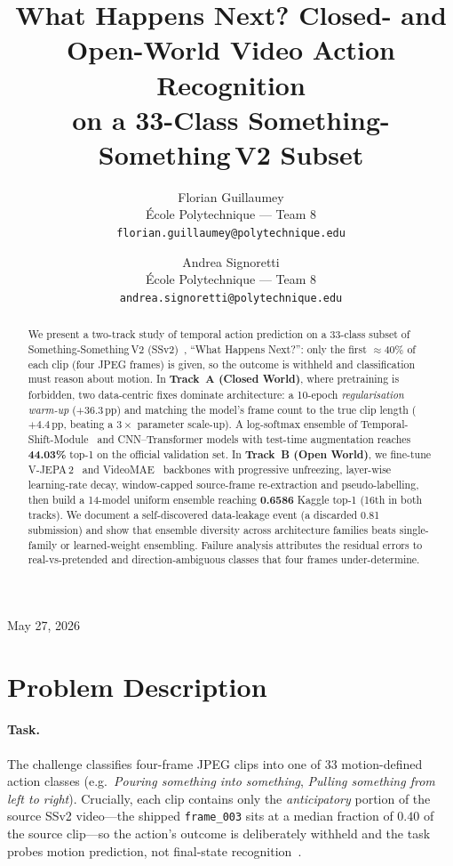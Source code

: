 \documentclass[10pt,twocolumn,letterpaper]{article}
\title{What Happens Next? Closed- and Open-World Video Action Recognition\\
on a 33-Class Something-Something\,V2 Subset}
\author{%
Florian Guillaumey\\
École Polytechnique --- Team 8\\
{\tt\small florian.guillaumey@polytechnique.edu}
\and
Andrea Signoretti\\
École Polytechnique --- Team 8\\
{\tt\small andrea.signoretti@polytechnique.edu}
}
\begin{document}
\maketitle
\thispagestyle{plain}
\pagestyle{plain}
\vspace{-1.2em}
\begin{center}\small May 27, 2026\end{center}

\begin{abstract}
We present a two-track study of temporal action prediction on a 33-class subset
of Something-Something\,V2 (SSv2)~\cite{goyal2017ssv2}, ``What Happens Next?'':
only the first ${\approx}40\%$ of each clip (four JPEG frames) is given, so the
outcome is withheld and classification must reason about motion. In
\textbf{Track~A (Closed World)}, where pretraining is forbidden, two data-centric
fixes dominate architecture: a 10-epoch \emph{regularisation warm-up}
($+36.3$\,pp) and matching the model's frame count to the true clip length
($+4.4$\,pp, beating a $3\times$ parameter scale-up). A log-softmax ensemble of
Temporal-Shift-Module~\cite{lin2019tsm} and CNN--Transformer models with
test-time augmentation reaches \textbf{44.03\%} top-1 on the official validation
set. In \textbf{Track~B (Open World)}, we fine-tune
V-JEPA\,2~\cite{bardes2025vjepa2} and VideoMAE~\cite{tong2022videomae} backbones
with progressive unfreezing, layer-wise learning-rate decay, window-capped
source-frame re-extraction and pseudo-labelling, then build a 14-model uniform
ensemble reaching \textbf{0.6586} Kaggle top-1 (16th in both tracks). We document
a self-discovered data-leakage event (a discarded 0.81 submission) and show that
ensemble diversity across architecture families beats single-family or
learned-weight ensembling. Failure analysis attributes the residual errors to
real-vs-pretended and direction-ambiguous classes that four frames
under-determine.
\end{abstract}

\section{Problem Description}
\label{sec:problem}

\paragraph{Task.}
The challenge classifies four-frame JPEG clips into one of 33 motion-defined
action classes (e.g.\ \emph{Pouring something into something}, \emph{Pulling
something from left to right}). Crucially, each clip contains only the
\emph{anticipatory} portion of the source SSv2 video---the shipped
\texttt{frame\_003} sits at a median fraction of $0.40$ of the source clip---so
the action's outcome is deliberately withheld and the task probes motion
prediction, not final-state recognition~\cite{goyal2017ssv2}.
\end{document}

